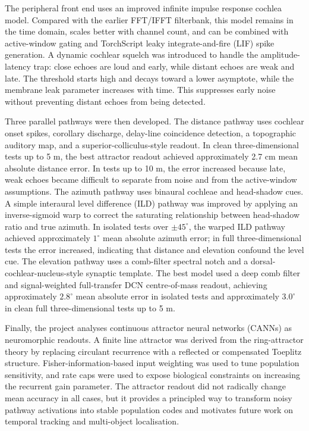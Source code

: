 \documentclass[12pt,a4paper]{report}
\begin{document}
The peripheral front end uses an improved infinite impulse response cochlea model. Compared with the earlier FFT/IFFT filterbank, this model remains in the time domain, scales better with channel count, and can be combined with active-window gating and TorchScript leaky integrate-and-fire (LIF) spike generation. A dynamic cochlear squelch was introduced to handle the amplitude-latency trap: close echoes are loud and early, while distant echoes are weak and late. The threshold starts high and decays toward a lower asymptote, while the membrane leak parameter increases with time. This suppresses early noise without preventing distant echoes from being detected.

Three parallel pathways were then developed. The distance pathway uses cochlear onset spikes, corollary discharge, delay-line coincidence detection, a topographic auditory map, and a superior-colliculus-style readout. In clean three-dimensional tests up to 5 m, the best attractor readout achieved approximately 2.7 cm mean absolute distance error. In tests up to 10 m, the error increased because late, weak echoes became difficult to separate from noise and from the active-window assumptions. The azimuth pathway uses binaural cochleae and head-shadow cues. A simple interaural level difference (ILD) pathway was improved by applying an inverse-sigmoid warp to correct the saturating relationship between head-shadow ratio and true azimuth. In isolated tests over $\pm45^\circ$, the warped ILD pathway achieved approximately $1^\circ$ mean absolute azimuth error; in full three-dimensional tests the error increased, indicating that distance and elevation confound the level cue. The elevation pathway uses a comb-filter spectral notch and a dorsal-cochlear-nucleus-style synaptic template. The best model used a deep comb filter and signal-weighted full-transfer DCN centre-of-mass readout, achieving approximately $2.8^\circ$ mean absolute error in isolated tests and approximately $3.0^\circ$ in clean full three-dimensional tests up to 5 m.

Finally, the project analyses continuous attractor neural networks (CANNs) as neuromorphic readouts. A finite line attractor was derived from the ring-attractor theory by replacing circulant recurrence with a reflected or compensated Toeplitz structure. Fisher-information-based input weighting was used to tune population sensitivity, and rate caps were used to expose biological constraints on increasing the recurrent gain parameter. The attractor readout did not radically change mean accuracy in all cases, but it provides a principled way to transform noisy pathway activations into stable population codes and motivates future work on temporal tracking and multi-object localisation.
\end{document}
